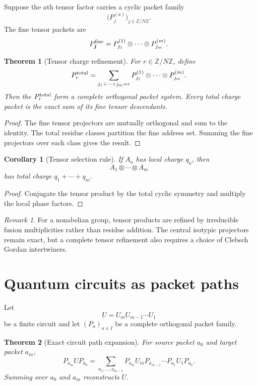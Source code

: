\documentclass{aomart}
\newtheorem{theorem}{Theorem}[section]
\newtheorem{corollary}[corollary]{Corollary}
\theoremstyle{definition}
\theoremstyle{remark}
\newtheorem{remark}[remark]{Remark}
\newcommand{\ZZ}{\mathbb Z}
\begin{document}
Suppose the \(a\)th tensor factor carries a cyclic packet family
\[
\bigl(P_j^{(a)}\bigr)_{j\in\ZZ/N\ZZ}.
\]
The fine tensor packets are
\[
P_{\bm j}^{\rm fine}
=
P_{j_1}^{(1)}\otimes\cdots\otimes P_{j_m}^{(m)}.
\]

\begin{theorem}[Tensor charge refinement]\label{thm:tensor_refinement}
For \(r\in\ZZ/N\ZZ\), define
\[
P_r^{\rm total}
=
\sum_{j_1+\cdots+j_m=r}
P_{j_1}^{(1)}\otimes\cdots\otimes P_{j_m}^{(m)}.
\]
Then the \(P_r^{\rm total}\) form a complete orthogonal packet system. Every total charge packet is the exact sum of its fine tensor descendants.
\end{theorem}

\begin{proof}
The fine tensor projectors are mutually orthogonal and sum to the identity. The total residue classes partition the fine address set. Summing the fine projectors over each class gives the result.
\end{proof}

\begin{corollary}[Tensor selection rule]\label{cor:tensor_selection}
If \(A_a\) has local charge \(q_a\), then
\[
A_1\otimes\cdots\otimes A_m
\]
has total charge \(q_1+\cdots+q_m\).
\end{corollary}

\begin{proof}
Conjugate the tensor product by the total cyclic symmetry and multiply the local phase factors.
\end{proof}

\begin{remark}\label{rem:nonabelian_fusion}
For a nonabelian group, tensor products are refined by irreducible fusion multiplicities rather than residue addition. The central isotypic projectors remain exact, but a complete tensor refinement also requires a choice of Clebsch Gordan intertwiners.
\end{remark}

\section{Quantum circuits as packet paths}\label{sec:circuits}

Let
\[
U=U_mU_{m-1}\cdots U_1
\]
be a finite circuit and let \((P_a)_{a\in I}\) be a complete orthogonal packet family.

\begin{theorem}[Exact circuit path expansion]\label{thm:circuit_path}
For source packet \(a_0\) and target packet \(a_m\),
\[
P_{a_m}UP_{a_0}
=
\sum_{a_1,\ldots,a_{m-1}}
P_{a_m}U_mP_{a_{m-1}}
\cdots
P_{a_1}U_1P_{a_0}.
\]
Summing over \(a_0\) and \(a_m\) reconstructs \(U\).
\end{theorem}
\end{document}
